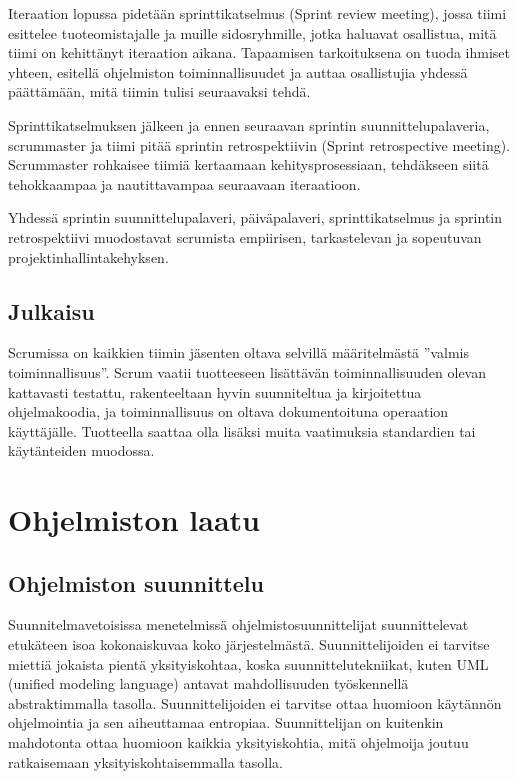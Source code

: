 \documentclass[finnish]{tktltiki2}
\theoremstyle{definition}
\theoremstyle{remark}
\begin{document}
Iteraation lopussa pidetään sprinttikatselmus (Sprint review meeting), jossa tiimi esittelee tuoteomistajalle ja muille sidosryhmille, jotka haluavat osallistua, mitä tiimi on kehittänyt iteraation aikana. Tapaamisen tarkoituksena on tuoda ihmiset yhteen, esitellä ohjelmiston toiminnallisuudet ja auttaa osallistujia yhdessä päättämään, mitä tiimin tulisi seuraavaksi tehdä\cite{SCH09}. 

Sprinttikatselmuksen jälkeen ja ennen seuraavan sprintin suunnittelupalaveria, scrummaster ja tiimi pitää sprintin retrospektiivin (Sprint retrospective meeting). Scrummaster rohkaisee tiimiä kertaamaan kehitysprosessiaan, tehdäkseen siitä tehokkaampaa ja nautittavampaa seuraavaan iteraatioon\cite{SCH09}.

Yhdessä sprintin suunnittelupalaveri, päiväpalaveri, sprinttikatselmus ja sprintin retrospektiivi muodostavat scrumista empiirisen, tarkastelevan ja sopeutuvan projektinhallintakehyksen\cite{SCH09}.

\subsection*{Julkaisu}
Scrumissa on kaikkien tiimin jäsenten oltava selvillä määritelmästä ''valmis toiminnallisuus''. Scrum vaatii tuotteeseen lisättävän toiminnallisuuden olevan kattavasti testattu, rakenteeltaan hyvin suunniteltua ja kirjoitettua ohjelmakoodia, ja toiminnallisuus on oltava dokumentoituna operaation käyttäjälle. Tuotteella saattaa olla lisäksi muita vaatimuksia standardien tai käytänteiden muodossa\cite{SCH09}.

\section{Ohjelmiston laatu}

\subsection{Ohjelmiston suunnittelu}

Suunnitelmavetoisissa menetelmissä ohjelmistosuunnittelijat suunnittelevat etukäteen isoa kokonaiskuvaa koko järjestelmästä. Suunnittelijoiden ei tarvitse miettiä jokaista pientä yksityiskohtaa, koska suunnittelutekniikat, kuten UML (unified modeling language) antavat mahdollisuuden työskennellä abstraktimmalla tasolla. Suunnittelijoiden ei tarvitse ottaa huomioon käytännön ohjelmointia ja sen aiheuttamaa entropiaa. Suunnittelijan on kuitenkin mahdotonta ottaa huomioon kaikkia yksityiskohtia, mitä ohjelmoija joutuu ratkaisemaan yksityiskohtaisemmalla tasolla\cite{FOW01b}.
\end{document}
